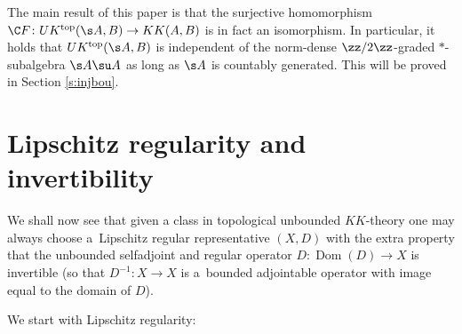 The main result of this paper is that the surjective homomorphism $\C F\colon UK^{{\rm top}}(\s A,B) \to KK(A,B)$ is in fact an isomorphism. In particular, it holds that $UK^{{\rm top}}(\s A,B)$ is independent of the norm-dense $\zz/2\zz$-graded $*$-subalgebra $\s A \su A$ as long as $\s A$ is countably generated. This will be proved in Section \ref{s:injbou}.



\section{Lipschitz regularity and invertibility}
We shall now see that given a class in topological unbounded $KK$-theory one may always choose a~Lipschitz regular representative $(X,D)$ with the extra property that the unbounded selfadjoint and regular operator $D\colon \operatorname{Dom}(D) \to X$ is invertible (so that $D^{-1}\colon X \to X$ is a~bounded adjointable operator with image equal to the domain of $D$).

We start with Lipschitz regularity:

